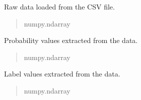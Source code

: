 \documentclass[letterpaper,10pt,english]{sphinxmanual}
\begin{document}
\begin{fulllineitems}

\begin{fulllineitems}
\label{\detokenize{calzone:calzone.utils.data_loader.data}}
\pysigstartsignatures
{}
\pysigstopsignatures
\sphinxAtStartPar
Raw data loaded from the CSV file.
\begin{quote}\begin{description}
\sphinxAtStartPar
numpy.ndarray

\end{description}\end{quote}

\end{fulllineitems}


\begin{fulllineitems}
\label{\detokenize{calzone:calzone.utils.data_loader.probs}}
\pysigstartsignatures
{}
\pysigstopsignatures
\sphinxAtStartPar
Probability values extracted from the data.
\begin{quote}\begin{description}
\sphinxAtStartPar
numpy.ndarray

\end{description}\end{quote}

\end{fulllineitems}


\begin{fulllineitems}
\label{\detokenize{calzone:calzone.utils.data_loader.labels}}
\pysigstartsignatures
{}
\pysigstopsignatures
\sphinxAtStartPar
Label values extracted from the data.
\begin{quote}\begin{description}
\sphinxAtStartPar
numpy.ndarray

\end{description}\end{quote}


\end{fulllineitems}
\end{fulllineitems}
\end{document}
